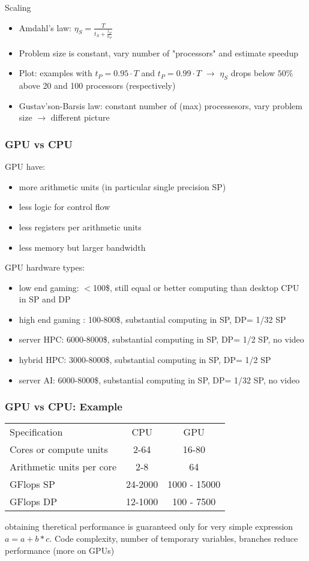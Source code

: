 \documentclass{beamer}
\begin{document}
\begin{frame}{Scaling}
\begin{itemize}
    \item Amdahl's law: $\eta_S = \frac{T}{t_S+\frac{t_P}{n_P}}$
    \item Problem size is constant, vary number of "processors" and estimate speedup
    \item Plot: examples with $t_P = 0.95 \cdot T$ and $t_P = 0.99 \cdot T$ $\longrightarrow$ $\eta_S$ drops below $50\%$ above 20 and 100 processors (respectively)
    \item Gustav'son-Barsis law: constant number of (max) processesors, vary problem size $\longrightarrow$ different picture
\end{itemize}
\end{frame}

\begin{frame}
\frametitle{GPU vs CPU}
\footnotesize
GPU have:
\begin{itemize}
\item more arithmetic units (in particular single precision SP)
\item less logic for control flow
\item less registers per arithmetic units
\item less memory but larger bandwidth
\end{itemize}

GPU hardware types:
\begin{itemize}
\item low end gaming:  $<$100\$, still equal or better computing than desktop CPU in SP and DP
\item high end gaming :   100-800\$, substantial computing in SP, DP= 1/32 SP    
\item server HPC: 6000-8000\$, substantial computing in SP, DP= 1/2 SP, no video
\item hybrid HPC: 3000-8000\$, substantial computing in SP, DP= 1/2 SP
\item server AI: 6000-8000\$, substantial computing in SP, DP= 1/32 SP, no video
\end{itemize}
\end{frame}



\begin{frame}
\frametitle{GPU vs CPU: Example}

\begin{tabular}{|l|c|c|}
Specification  & CPU & GPU  \\
Cores or compute units    & 2-64  & 16-80  \\
Arithmetic units per core & 2-8 & 64  \\
GFlops SP  & 24-2000 & 1000 - 15000 \\ 
GFlops DP  & 12-1000 & 100 - 7500 \\
\end{tabular}

obtaining theretical performance is guaranteed only for very simple expression $a = a + b * c$. Code complexity, number of temporary variables, branches reduce performance (more on GPUs)
\end{frame}
\end{document}
